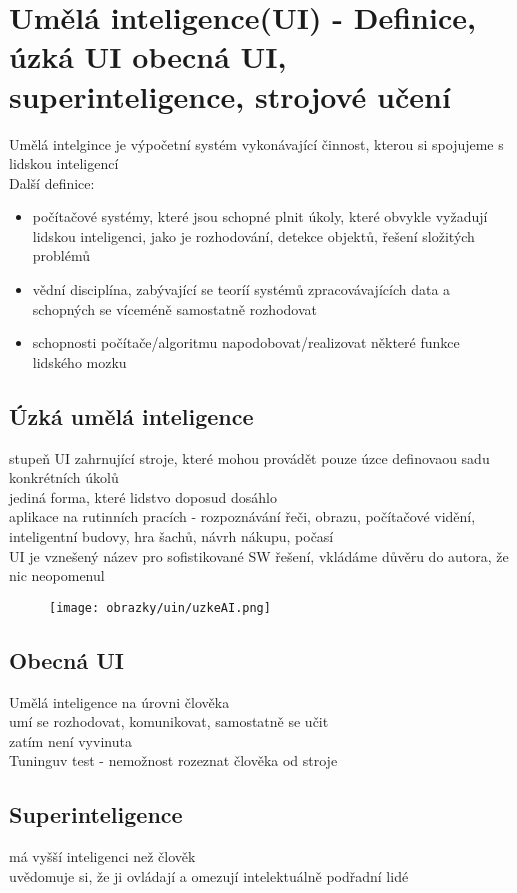 
\section{Umělá inteligence(UI) - Definice, úzká UI obecná UI, superinteligence, strojové učení}
Umělá intelgince je výpočetní systém vykonávající činnost, kterou si spojujeme s lidskou inteligencí\\
Další definice: 
\begin{itemize}
    \item počítačové systémy, které jsou schopné plnit úkoly, které obvykle vyžadují lidskou inteligenci, jako je rozhodování, detekce objektů, řešení složitých problémů
    \item vědní disciplína, zabývající se teoríí systémů zpracovávajících data a schopných se víceméně samostatně rozhodovat
    \item schopnosti počítače/algoritmu napodobovat/realizovat některé funkce lidského mozku
\end{itemize}
\subsection*{Úzká umělá inteligence}
stupeň UI zahrnující stroje, které mohou provádět pouze úzce definovaou sadu konkrétních úkolů\\
jediná forma, které lidstvo doposud dosáhlo\\
aplikace na rutinních pracích - rozpoznávání řeči, obrazu, počítačové vidění, inteligentní budovy, hra šachů, návrh nákupu, počasí\\
UI je vznešený název pro sofistikované SW řešení, vkládáme důvěru do autora, že nic neopomenul\\
\begin{figure}[H]
    \texttt{[image: obrazky/uin/uzkeAI.png]}
\end{figure}
\subsection*{Obecná UI}
Umělá inteligence na úrovni člověka\\
umí se rozhodovat, komunikovat, samostatně se učit\\
zatím není vyvinuta\\
Tuninguv test - nemožnost rozeznat člověka od stroje\\

\subsection*{Superinteligence}
má vyšší inteligenci než člověk\\
uvědomuje si, že ji ovládají a omezují intelektuálně podřadní lidé\\



